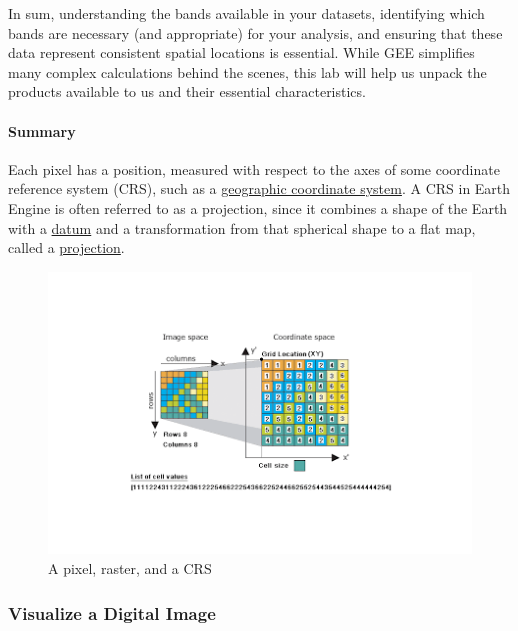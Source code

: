 \documentclass[
]{article}
\begin{document}
In sum, understanding the bands available in your datasets, identifying which bands are necessary (and appropriate) for your analysis, and ensuring that these data represent consistent spatial locations is essential. While GEE simplifies many complex calculations behind the scenes, this lab will help us unpack the products available to us and their essential characteristics.

\hypertarget{summary}{%
\paragraph*{Summary}\label{summary}}

Each pixel has a position, measured with respect to the axes of some coordinate reference system (CRS), such as a \href{https://en.wikipedia.org/wiki/Geographic_coordinate_system}{geographic coordinate system}. A CRS in Earth Engine is often referred to as a projection, since it combines a shape of the Earth with a \href{https://en.wikipedia.org/wiki/Geodetic_datum}{datum} and a transformation from that spherical shape to a flat map, called a \href{https://en.wikipedia.org/wiki/Map_projection}{projection}.

\begin{figure}

{\centering \includegraphics[width=0.8\linewidth]{./im/im_02_02} 

}

\caption{A pixel, raster, and a CRS}\label{fig:pixel}
\end{figure}

\hypertarget{visualize-a-digital-image}{%
\subsubsection{Visualize a Digital Image}\label{visualize-a-digital-image}}
\end{document}
